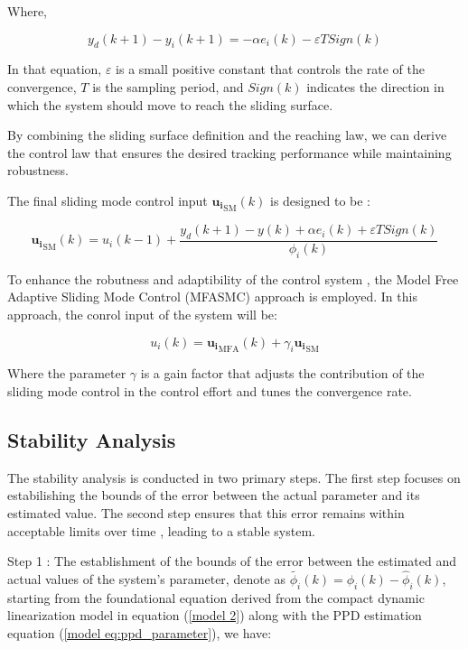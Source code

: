 \documentclass[journal,onecolumn]{IEEEtran}
\begin{document}
Where,

\begin{equation}
    \label{model 13}
    y_d(k+1) - y_i(k+1) = - \alpha e_i(k) - \varepsilon T Sign(k) 
\end{equation}


In that equation, \(\varepsilon\) is a small positive constant that controls the rate of the convergence, \(T\) is the sampling period, and \(Sign(k)\) indicates the direction in which the system should move to reach the sliding surface.

By combining the sliding surface definition and the reaching law, we can derive the control law that ensures the desired tracking performance while maintaining robustness.

The final sliding mode control input \(\mathbf{u_i}_{\text{SM}}(k)\) is designed to be :

\begin{equation}
    \label{model eq:smc}
    \mathbf{u_i}_{\text{SM}}(k) = u_i(k-1) + \frac{y_d(k+1)-y(k) + \alpha e_i(k) + \varepsilon T Sign(k)}{\phi_i(k)}
\end{equation}

To enhance the robutness and adaptibility of the control system , the Model Free Adaptive Sliding Mode Control (MFASMC) approach is employed. In this approach, the conrol input of the system will be:

\begin{equation}
    \label{model eq:mfasmc}
    u_i(k) = \mathbf{u_i}_{\text{MFA}}(k) + \gamma_i \mathbf{u_i}_{\text{SM}}
\end{equation}

Where the parameter \(\gamma\) is a gain factor that adjusts the contribution of the sliding mode control in the control effort and tunes the convergence rate.

\subsection{Stability Analysis}

The stability analysis is conducted in two primary steps. The first step focuses on estabilishing the bounds of the error between the actual parameter and its estimated value. The second step ensures that this error remains within acceptable limits over time , leading to a stable system.

Step 1 : The establishment of the bounds of the error between the estimated and actual values of the system's parameter, denote as \(\tilde{\phi_i}(k)
= \phi_i(k) - \hat{\phi}_i(k)\), starting from the foundational equation derived from the compact dynamic linearization model in equation (\ref{model 2}) along with the PPD estimation equation (\ref{model eq:ppd_parameter}), we have:
\end{document}
